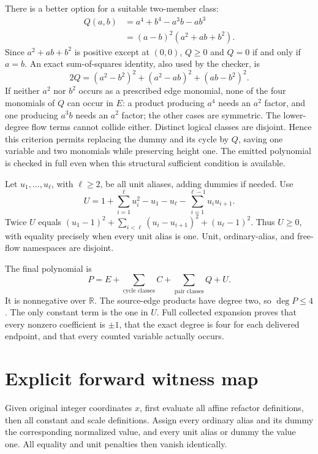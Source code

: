 There is a better option for a suitable two-member class:
\begin{align*}
 Q(a,b)&=a^4+b^4-a^3b-ab^3\\
       &=(a-b)^2(a^2+ab+b^2).
\end{align*}
Since \(a^2+ab+b^2\) is positive except at \((0,0)\),
\(Q\geq0\) and \(Q=0\) if and only if \(a=b\). An exact
sum-of-squares identity, also used by the checker, is
\[
 2Q=(a^2-b^2)^2+(a^2-ab)^2+(ab-b^2)^2.
\]
If neither \(a^2\) nor \(b^2\) occurs as a prescribed edge monomial,
none of the four monomials of \(Q\) can occur in \(E\): a product
producing \(a^4\) needs an \(a^2\) factor, and one producing
\(a^3b\) needs an \(a^2\) factor; the other cases are symmetric.
The lower-degree flow terms cannot collide either. Distinct logical
classes are disjoint. Hence this criterion permits replacing the dummy
and its cycle by \(Q\), saving one variable and two monomials while
preserving height one. The emitted polynomial is checked in full even
when this structural sufficient condition is available.

Let \(u_1,\ldots,u_\ell\), with \(\ell\geq2\), be all unit aliases,
adding dummies if needed. Use
\[
 U=1+\sum_{i=1}^{\ell}u_i^2-u_1-u_\ell-
                      \sum_{i=1}^{\ell-1}u_iu_{i+1}.
\]
Twice \(U\) equals
\((u_1-1)^2+\sum_{i<\ell}(u_i-u_{i+1})^2+(u_\ell-1)^2\).
Thus \(U\geq0\), with equality precisely when every unit alias is one.
Unit, ordinary-alias, and free-flow namespaces are disjoint.

The final polynomial is
\[
 \boxed{\displaystyle P=E+\sum_{\text{cycle classes}}C+
                         \sum_{\text{pair classes}}Q+U.}
\]
It is nonnegative over \(\mathbb R\). The source-edge products have
degree two, so \(\deg P\leq4\). The only constant term is the one
in \(U\). Full collected expansion proves that every nonzero coefficient
is \(\pm1\), that the exact degree is four for each delivered endpoint,
and that every counted variable actually occurs.

\section{Explicit forward witness map}
Given original integer coordinates \(x\), first evaluate all affine
refactor definitions, then all constant and scale definitions. Assign
every ordinary alias and its dummy the corresponding normalized value,
and every unit alias or dummy the value one. All equality and unit
penalties then vanish identically.

